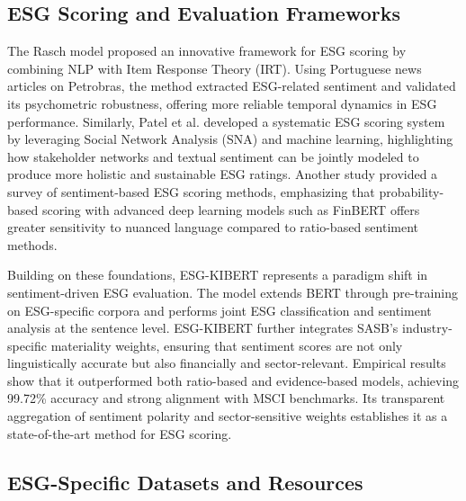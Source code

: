 \documentclass[12pt, letterpaper]{template}
\begin{document}
\subsection{ESG Scoring and Evaluation Frameworks}

The Rasch model \citep{Soares2024} proposed an innovative framework for ESG scoring by combining NLP with Item Response Theory (IRT). Using Portuguese news articles on Petrobras, the method extracted ESG-related sentiment and validated its psychometric robustness, offering more reliable temporal dynamics in ESG performance. Similarly, Patel et al. \citep{Patel2023} developed a systematic ESG scoring system by leveraging Social Network Analysis (SNA) and machine learning, highlighting how stakeholder networks and textual sentiment can be jointly modeled to produce more holistic and sustainable ESG ratings. Another study \citep{Zhang2023} provided a survey of sentiment-based ESG scoring methods, emphasizing that probability-based scoring with advanced deep learning models such as FinBERT offers greater sensitivity to nuanced language compared to ratio-based sentiment methods.

Building on these foundations, ESG-KIBERT \citep{esg-kibert} represents a paradigm shift in sentiment-driven ESG evaluation. The model extends BERT through pre-training on ESG-specific corpora and performs joint ESG classification and sentiment analysis at the sentence level. ESG-KIBERT further integrates SASB’s industry-specific materiality weights, ensuring that sentiment scores are not only linguistically accurate but also financially and sector-relevant. Empirical results show that it outperformed both ratio-based and evidence-based models, achieving 99.72\% accuracy and strong alignment with MSCI benchmarks. Its transparent aggregation of sentiment polarity and sector-sensitive weights establishes it as a state-of-the-art method for ESG scoring.


\subsection{ESG-Specific Datasets and Resources}
\end{document}
